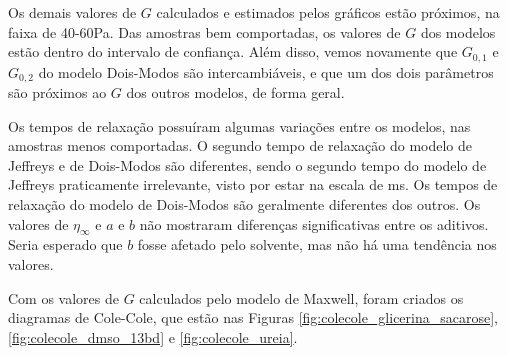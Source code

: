 		Os demais valores de \(G\) calculados e estimados pelos gráficos estão próximos, na faixa de 40-60Pa. Das amostras bem comportadas, os valores de \(G\) dos modelos estão dentro do intervalo de confiança. Além disso, vemos novamente que \(G_{0,1}\) e \(G_{0,2}\) do modelo Dois-Modos são intercambiáveis, e que um dos dois parâmetros são próximos ao \(G\) dos outros modelos, de forma geral.
		
		Os tempos de relaxação possuíram algumas variações entre os modelos, nas amostras menos comportadas. O segundo tempo de relaxação do modelo de Jeffreys e de Dois-Modos são diferentes, sendo o segundo tempo do modelo de Jeffreys praticamente irrelevante, visto por estar na escala de ms. Os tempos de relaxação do modelo de Dois-Modos são geralmente diferentes dos outros. Os valores de \(\eta_{\infty}\) e \(a\) e \(b\) não mostraram diferenças significativas entre os aditivos. Seria esperado que \(b\) fosse afetado pelo solvente, mas não há uma tendência nos valores.
		
		Com os valores de \(G\) calculados pelo modelo de Maxwell, foram criados os diagramas de Cole-Cole, que estão nas Figuras \ref{fig:colecole_glicerina_sacarose}, \ref{fig:colecole_dmso_13bd} e \ref{fig:colecole_ureia}.
		
